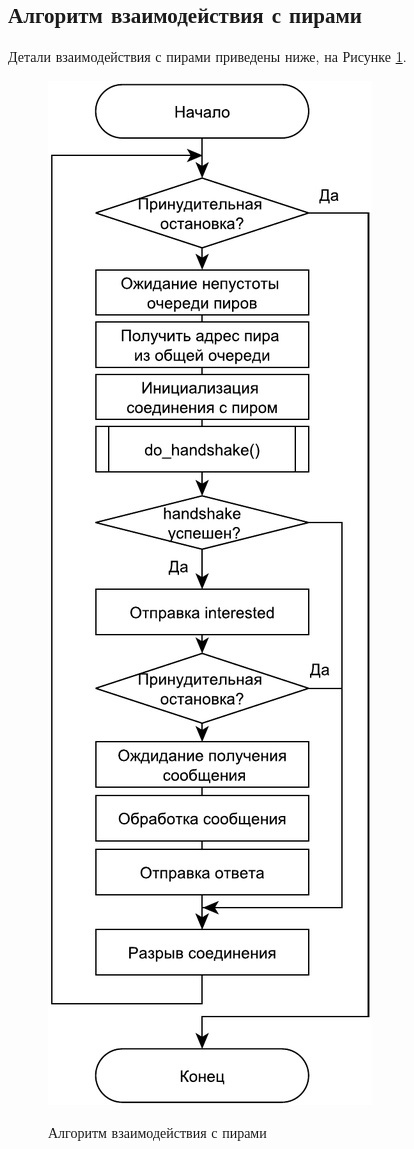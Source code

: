 \subsection{Алгоритм взаимодействия с пирами}
Детали взаимодействия с пирами приведены ниже, на Рисунке \ref{fig203:image}.
\begin{figure}[h]
	\begin{center}
		{\includegraphics[scale = 0.67]{img/peer.pdf}}
		\caption{Алгоритм взаимодействия с пирами}
		\label{fig203:image}
	\end{center}
\end{figure}